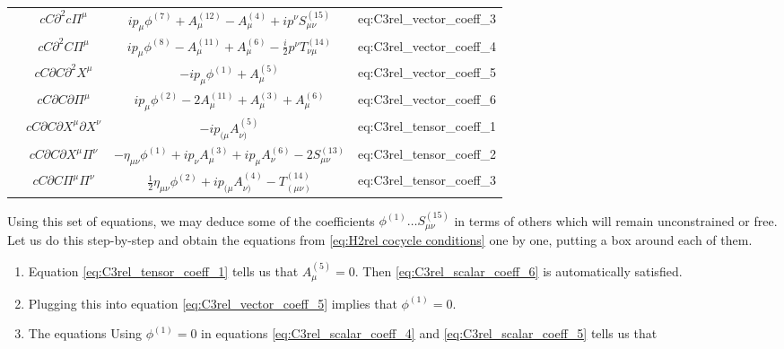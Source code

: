 \documentclass[11pt,reqno,a4paper,final]{amsart}
\theoremstyle{plain}
\theoremstyle{definition}
\renewcommand{\d}{\partial}
\newcommand{\phisup}[1]{\phi^{(#1)}}
\newcommand{\Asup}[1]{A^{(#1)}}
\newcommand{\1}{\mathbb{1}}
\numberwithin{equation}{section}
\begin{document}
\begin{appendices}
\begin{table}[h]
\begin{tabular}{|c|c|c L|}
                               & $cC \d^2 c \Pi^\mu$ & $ip_\mu \phisup{7} + \Asup{12}_\mu - \Asup{4}_\mu + ip^\nu S^{(15)}_{\mu\nu}$  & eq:C3rel_vector_coeff_3 \\
                               & $cC \d^2 C \Pi^\mu$ & $ip_\mu \phisup{8} - \Asup{11}_\mu + \Asup{6}_\mu - \tfrac i2 p^\nu T^{(14)}_{\nu\mu}$  & eq:C3rel_vector_coeff_4 \\
                               & $cC \d C \d^2 X^\mu$ & $-ip_\mu \phisup{1} + \Asup{5}_\mu$  & eq:C3rel_vector_coeff_5 \\
                               & $cC \d C \d \Pi^\mu$ & $ip_\mu \phisup{2} - 2\Asup{11}_\mu + \Asup{3}_\mu + \Asup{6}_\mu$ & eq:C3rel_vector_coeff_6 \\ \midrule
      & $cC \d C \d X^\mu \d X^\nu$ & $-ip_{(\mu} \Asup{5}_{\nu)}$ & eq:C3rel_tensor_coeff_1\\
                               & $cC \d C \d X^\mu \Pi^\nu$ & $-\eta_{\mu\nu} \phisup{1} + ip_\nu\Asup{3}_\mu + ip_\mu \Asup{6}_\nu - 2S^{(13)}_{\mu\nu}$ & eq:C3rel_tensor_coeff_2 \\
                               & $cC \d C \Pi^\mu \Pi^\nu$ & $\tfrac12\eta_{\mu\nu} \phisup{2} + ip_{(\mu}\Asup{4}_{\nu)} - T^{(14)}_{(\mu\nu)}$  & eq:C3rel_tensor_coeff_3 \\
     \bottomrule
    \end{tabular}
\end{table}
Using this set of equations, we may deduce some of the coefficients $\phi^{(1)}\dots S^{(15)}_{\mu\nu}$ in terms of others which will remain unconstrained or free. Let us do this step-by-step and obtain the equations from \eqref{eq:H2rel cocycle conditions} one by one, putting a box around each of them. 
\begin{enumerate}
    \item Equation \eqref{eq:C3rel_tensor_coeff_1} tells us that $\boxed{A^{(5)}_\mu = 0}$. Then \eqref{eq:C3rel_scalar_coeff_6} is automatically satisfied.
    \item Plugging this into equation \eqref{eq:C3rel_vector_coeff_5} implies that $\boxed{\phisup{1} = 0}$.
    \item The equations 
    Using $\phisup{1} = 0$ in equations \eqref{eq:C3rel_scalar_coeff_4} and \eqref{eq:C3rel_scalar_coeff_5}
    tells us that 

\end{enumerate}
\end{appendices}
\end{document}
